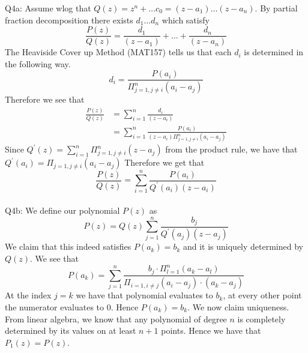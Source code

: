 \documentclass[letterpaper]{article}
\begin{document}
\noindent
Q4a: 
Assume wlog that $Q(z) = z^n + \dots c_0 = (z-a_1)\dots(z-a_n)$. By partial fraction decomposition there exists $d_1\dots d_n$ which satisfy 
$$\frac{P(z)}{Q(z)} = \frac{d_1}{(z-a_1)} + \dots + \frac{d_n}{(z-a_n)} $$
The Heaviside Cover up Method (MAT157) tells us that each $d_i$ is determined in the following way. 
$$d_i = \frac{P(a_i)}{\Pi_{j=1, j\neq i}^n (a_i -a_j)}$$
Therefore we see that 
\begin{align*}
    \frac{P(z)}{Q(z)} & = \sum_{i=1}^n \frac{d_i}{(z-a_i)}
    \\ & = \sum_{i=1}^n \frac{P(a_i)}{(z-a_i)\Pi_{j=1, j\neq i}^n (a_i -a_j)}
\end{align*}
Since $Q^\prime(z) = \sum_{i=1}^n \Pi_{j=1,j\neq i}^n (z-a_j)$ from the product rule, we have that $Q^\prime(a_i) = \Pi_{j=1,j\neq i}(a_i - a_j)$
Therefore we get that $$\frac{P(z)}{Q(z)} =\sum_{i=1}^n \frac{P(a_i)}{Q^\prime(a_i)(z-a_i)}$$
\newline \\ Q4b: We define our polynomial $P(z)$ as $$P(z) = Q(z) \sum_{j=1}^n \frac{b_j}{Q^\prime(a_j)(z-a_j)}$$ We claim that this indeed satisfies $P(a_k)=b_k$ and it is uniquely determined by $Q(z)$. 
We see that 
$$
    P(a_k) = \sum_{j=1}^n \frac{b_j \cdot \Pi_{l=1}^n(a_k-a_l)}{\Pi_{i=1, i \neq j}(a_i-a_j)\cdot (a_k -a_j)}
$$
At the index $j=k$ we have that polynomial evaluates to $b_k$, at every other point the numerator evaluates to 0. Hence $P(a_k) = b_k$.
We now claim uniqueness. From linear algebra, we know that any polynomial of degree $n$ is completely determined by its values on at least $n+1$ points. Hence we have that $P_1(z) = P(z)$. 
\end{document}
